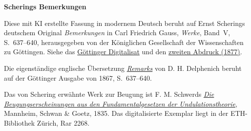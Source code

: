 \clearpage
{}
\begin{center}\textbf{Scherings Bemerkungen}\end{center}
\noindent Diese mit KI erstellte Fassung in modernem Deutsch beruht auf Ernst Scherings deutschem Original \textit{Bemerkungen} in Carl Friedrich Gauss, \textit{Werke}, Band~V, S.~637--640, herausgegeben von der Königlichen Gesellschaft der Wissenschaften zu Göttingen. Siehe das \href{https://gdz.sub.uni-goettingen.de/id/PPN236006339}{Göttinger Digitalisat} und den \href{https://archive.org/download/Werkecarlf05gausrich/page/n648}{zweiten Abdruck (1877)}.
\par\smallskip\noindent Die eigenständige englische Übersetzung \href{https://neo-classical-physics.info/uploads/3/4/3/6/34363841/schering_-_remarks_on_gauss.pdf}{\textit{Remarks}} von D. H. Delphenich beruht auf der Göttinger Ausgabe von 1867, S.~637--640.
\par\smallskip\noindent Das von Schering erwähnte Werk zur Beugung ist F. M. Schwerds \href{https://doi.org/10.3931/e-rara-16523}{\textit{Die Beugungserscheinungen aus den Fundamentalgesetzen der Undulationstheorie}}, Mannheim, Schwan \& Goetz, 1835. Das digitalisierte Exemplar liegt in der ETH-Bibliothek Zürich, Rar 2268.
\clearpage
